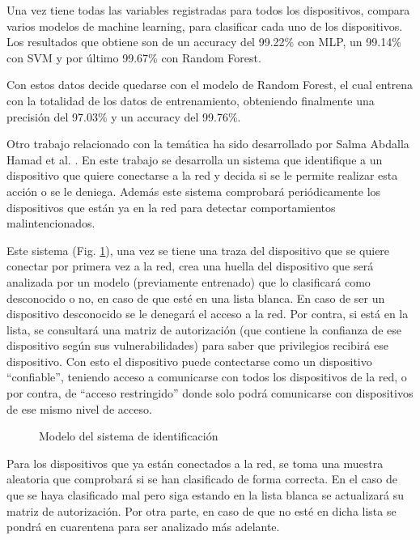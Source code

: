 Una vez tiene todas las variables registradas para todos los dispositivos, compara varios modelos de machine learning, para clasificar cada uno de los dispositivos. Los resultados que obtiene son de un accuracy del 99.22\% con MLP, un 99.14\% con SVM y por último 99.67\% con Random Forest.

Con estos datos decide quedarse con el modelo de Random Forest, el cual entrena con la totalidad de los datos de entrenamiento, obteniendo finalmente una precisión del 97.03\% y un accuracy del 99.76\%.

Otro trabajo relacionado con la temática ha sido desarrollado por Salma Abdalla Hamad et al. \cite{hamad2019iot}. En este trabajo se desarrolla un sistema que identifique a un dispositivo que quiere conectarse a la red y decida si se le permite realizar esta acción o se le deniega. Además este sistema comprobará periódicamente los dispositivos que están ya en la red para detectar comportamientos malintencionados. 

Este sistema (Fig. \ref{fig:diam_hamad}), una vez se tiene una traza del dispositivo que se quiere conectar por primera vez a la red, crea una huella del dispositivo que será analizada por un modelo (previamente entrenado) que lo clasificará como desconocido o no, en caso de que esté en una lista blanca. En caso de ser un dispositivo desconocido se le denegará el acceso a la red. Por contra, si está en la lista, se consultará una matriz de autorización (que contiene la confianza de ese dispositivo según sus vulnerabilidades) para saber que privilegios recibirá ese dispositivo. Con esto el dispositivo puede contectarse como un dispositivo ``confiable'', teniendo acceso a comunicarse con todos los dispositivos de la red, o por contra, de ``acceso restringido'' donde solo podrá comunicarse con dispositivos de ese mismo nivel de acceso.

\begin{figure}[htpb!]
    \centering
    \resizebox{0.6\textwidth}{!}{
        
    }
    \caption{Modelo del sistema de identificación \cite{hamad2019iot}}
    \label{fig:diam_hamad}
\end{figure}

Para los dispositivos que ya están conectados a la red, se toma una muestra aleatoria que comprobará si se han clasificado de forma correcta. En el caso de que se haya clasificado mal pero siga estando en la lista blanca se actualizará su matriz de autorización. Por otra parte, en caso de que no esté en dicha lista se pondrá en cuarentena para ser analizado más adelante.

